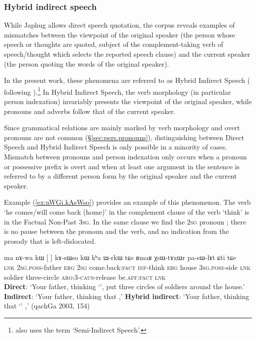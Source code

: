 \subsubsection{Hybrid indirect speech} \label{sec:hybrid indirect}
While Japhug allows direct speech quotation, the corpus reveals examples of mismatches between the viewpoint of the original speaker (the person whose speech or thoughts are quoted, subject of the complement-taking verb of speech/thought which selects the reported speech clause) and the current speaker (the person quoting the words of the original speaker).

In the present work, these phenomena are referred to as Hybrid Indirect Speech (\citealt{jacques16complementation} following \citet{tournadre08conjunct}).\footnote{\citet{aikhenvald08semidirect} also uses the term `Semi-Indirect Speech'. } In Hybrid Indirect Speech, the verb morphology (in particular person indexation) invariably presents the viewpoint of the original speaker, while pronouns and adverbs follow that of the current speaker.

Since grammatical relations are mainly marked by verb morphology and overt pronouns are not common (§\ref{sec:pers.pronouns}), distinguishing between Direct Speech and Hybrid Indirect Speech is only possible in a minority of cases. Mismatch between pronouns and person indexation only occurs when a pronoun or possessive prefix is overt and when at least one argument in the sentence is referred to by a different person form by the original speaker and the current speaker. 
   
Example (\ref{ex:nWGi.kAsWso}) provides an example of this phenomenon. The verb  `he comes/will come back (home)' in the complement clause of the verb  `think' is in the Factual Non-Past \textsc{3sg}. In the same clause we find the \textsc{2sg} pronoun ; there is no pause between the pronoun and the verb, and no indication from the prosody that  is left-dislocated. 


\begin{exe}
\ex \label{ex:nWGi.kAsWso}
\gll ma nɤ-wa kɯ [ 	]  kɤ-sɯso kɯ kʰa ɯ-rkɯ tɕe ʁmaʁ χsɯ-tɤxɯr pa-sɯ-lɤt ɕti tɕe \\
\textsc{lnk} \textsc{2sg}.\textsc{poss}-father \textsc{erg} \textsc{2sg} {come.back:\textsc{fact}}  \textsc{inf}-think \textsc{erg} house \textsc{3sg}.\textsc{poss}-side \textsc{lnk} soldier three-circle \textsc{aro}:3\flobv{}-\textsc{caus}-release be.\textsc{aff}:\textsc{fact} \textsc{lnk}\\
\glt \textbf{Direct}: `Your father, thinking `',   put three circles of soldiers around the house.' 
\glt  \textbf{Indirect}: `Your father, thinking that ,'
\glt  \textbf{Hybrid indirect}: `Your father, thinking that `' ,' (qachGa 2003, 154)
\end{exe}


